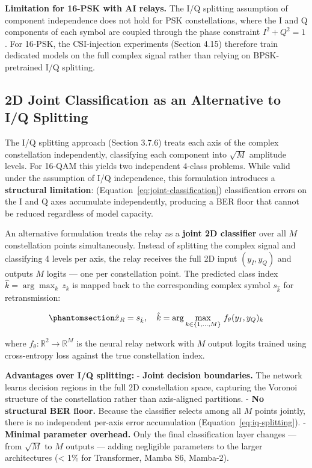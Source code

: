 \documentclass[
  english,
  12pt,
  12pt,
  a4paper,
  oneside]{report}
\begin{document}
\textbf{Limitation for 16-PSK with AI relays.} The I/Q splitting assumption of component independence does not hold for PSK constellations, where the I and Q components of each symbol are coupled through the phase constraint \(I^2 + Q^2 = 1\). For 16-PSK, the CSI-injection experiments (Section 4.15) therefore train dedicated models on the full complex signal rather than relying on BPSK-pretrained I/Q splitting.

\subsection{2D Joint Classification as an Alternative to I/Q Splitting}\label{sec:d-joint-classification-as-an-alternative-to-iq-splitting}

The I/Q splitting approach (Section 3.7.6) treats each axis of the complex constellation independently, classifying each component into \(\sqrt{M}\) amplitude levels. For 16-QAM this yields two independent 4-class problems. While valid under the assumption of I/Q independence, this formulation introduces a \textbf{structural limitation}: (Equation~\ref{eq:joint-classification}) classification errors on the I and Q axes accumulate independently, producing a BER floor that cannot be reduced regardless of model capacity.

An alternative formulation treats the relay as a \textbf{joint 2D classifier} over all \(M\) constellation points simultaneously. Instead of splitting the complex signal and classifying 4 levels per axis, the relay receives the full 2D input \((y_I, y_Q)\) and outputs \(M\) logits --- one per constellation point. The predicted class index \(\hat{k} = \arg\max_k \, z_k\) is mapped back to the corresponding complex symbol \(s_{\hat{k}}\) for retransmission:

\begin{equation}\protect\phantomsection\label{eq:joint-classification}{\hat{x}_R = s_{\hat{k}}, \quad \hat{k} = \arg\max_{k \in \{1, \dots, M\}} \, f_\theta(y_I, y_Q)_k
}\end{equation}

where \(f_\theta : \mathbb{R}^2 \to \mathbb{R}^M\) is the neural relay network with \(M\) output logits trained using cross-entropy loss against the true constellation index.

\textbf{Advantages over I/Q splitting:} - \textbf{Joint decision boundaries.} The network learns decision regions in the full 2D constellation space, capturing the Voronoi structure of the constellation rather than axis-aligned partitions. - \textbf{No structural BER floor.} Because the classifier selects among all \(M\) points jointly, there is no independent per-axis error accumulation (Equation~\ref{eq:iq-splitting}). - \textbf{Minimal parameter overhead.} Only the final classification layer changes --- from \(\sqrt{M}\) to \(M\) outputs --- adding negligible parameters to the larger architectures (\textless{} 1\% for Transformer, Mamba S6, Mamba-2).
\end{document}
